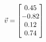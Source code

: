 \documentclass[preview]{standalone}
\begin{document}
\begin{align*}
\special{dvisvgm:raw <g id='unique000'>}\vec{v} = \begin{bmatrix} 0.45 \\ -0.82 \\ 0.12 \\ 0.74 \end{bmatrix}\special{dvisvgm:raw </g>}
\end{align*}
\end{document}
